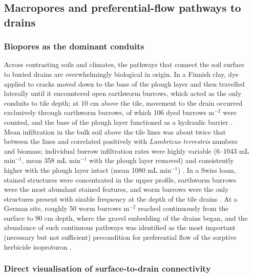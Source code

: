 \documentclass[11pt]{article}
\begin{document}
\subsection{Macropores and preferential-flow pathways to drains}

\subsubsection{Biopores as the dominant conduits}

Across contrasting soils and climates, the pathways that connect the soil surface to
buried drains are overwhelmingly biological in origin. In a Finnish clay, dye applied
to cracks moved down to the base of the plough layer and then travelled laterally
until it encountered open earthworm burrows, which acted as the only conduits to tile
depth; at 10 cm above the tile, movement to the drain occurred exclusively through
earthworm burrows, of which 106 dyed burrows m$^{-2}$ were counted, and the base of
the plough layer functioned as a hydraulic barrier \parencite{Shipitalo2004}. Mean
infiltration in the bulk soil above the tile lines was about twice that between the
lines and correlated positively with \textit{Lumbricus terrestris} numbers and
biomass; individual burrow infiltration rates were highly variable (6--1043 mL
min$^{-1}$, mean 358 mL min$^{-1}$ with the plough layer removed) and consistently
higher with the plough layer intact (mean 1080 mL min$^{-1}$)
\parencite{Shipitalo2004}. In a Swiss loam, stained structures were concentrated in
the upper profile, earthworm burrows were the most abundant stained features, and
worm burrows were the only structures present with sizable frequency at the depth of
the tile drains \parencite{Stamm2002}. At a German site, roughly 50 worm burrows
m$^{-2}$ reached continuously from the surface to 90 cm depth, where the gravel
embedding of the drains began, and the abundance of such continuous pathways was
identified as the most important (necessary but not sufficient) precondition for
preferential flow of the sorptive herbicide isoproturon \parencite{Zehe2001}.

\subsubsection{Direct visualisation of surface-to-drain connectivity}
\end{document}
